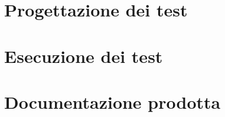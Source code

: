 \section{Progettazione dei test}
\label{sec:progettazione-test}

\section{Esecuzione dei test}
\label{sec:esecuzione-test}

\section{Documentazione prodotta}
\label{sec:documentazione}
